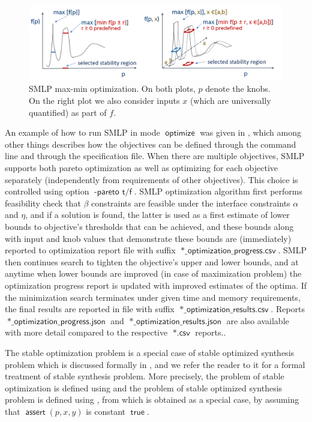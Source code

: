 \documentclass[a4paper,parskip=half]{article} %
\newcommand*\assert{\operatorname{\mathsf{assert}}}
\newcommand*\optionval[2]{\operatorname{\mathsf{#1}\,\,\mathsf{#2}}} %
\newcommand*\suffix[1]{\operatorname{\mathsf{#1}}} %
\newcommand*\mode[1]{\operatorname{\mathsf{#1}}} %
\newcommand*\operator[1]{\operatorname{\mathsf{{#1}}}} %
\begin{document}
\begin{figure}[tp]
\center
\includegraphics[width= 0.7\columnwidth]{smlp_maxmin.PNG}
\caption{SMLP max-min optimization. On both plots, $p$ denote the knobs. On the right plot we also consider inputs $x$ 
(which are universally quantified) as part of $f$.} \label{smlp_maxmin}
\end{figure}

An example of how to run SMLP in mode $\mode{optimize}$ was given in , which among other
things describes how the objectives can be defined through the command line and through the specification file.
When there are multiple objectives, SMLP supports both pareto optimization as well as optimizing for each objective
separately (independently from requirements of other objectives). This choice is controlled using option 
$\optionval{-pareto}{t/f}$. SMLP optimization algorithm first performs feasibility check that $\beta$ constraints are 
feasible under the interface constraints $\alpha$ and $\eta$, and if a solution is found, the latter is used as a first
estimate of lower bounds to objective's thresholds that can be achieved, and these bounds along with input and knob
values that demonstrate these bounds are (immediately) reported to optimization report file  with suffix
$\suffix{*\_optimization\_progress.csv}$.  SMLP then continues search to tighten the objective's upper and lower bounds,
and at anytime when lower bounds are improved (in case of maximization problem) the optimization progress report
is updated with improved estimates of the optima. If the minimization search terminates under given time and memory
requirements, the final results are reported in file with suffix  $\suffix{*\_optimization\_results.csv}$. Reports
$\suffix{*\_optimization\_progress.json}$ and  $\suffix{*\_optimization\_results.json}$ are also available with 
more detail compared to the respective $\suffix{*.csv}$ reports.. 

The stable optimization problem is a special case of stable optimized synthesis problem which is discussed formally
in , and we refer the reader to it  for a formal treatment of stable synthesis problem. 
More precisely, the problem of stable optimization is defined using  and the 
problem of stable optimized synthesis problem is defined using , from which 
is obtained as a special case, by assuming that $\assert(p,x,y)$ is constant $\operator{true}$.
\end{document}
